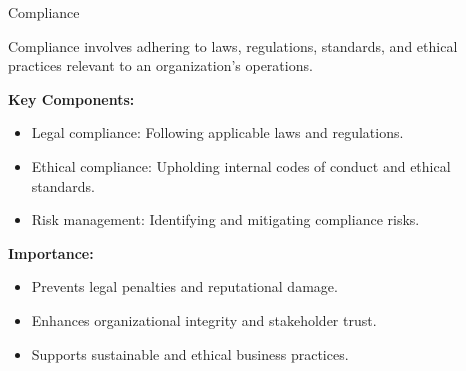 \documentclass[aspectratio=169, 10pt]{beamer}
\begin{document}
\begin{frame}{Compliance}

\begin{tcolorbox}[colback=WHUblue!5!white, colframe=WHUblue, title=Definition, fonttitle=\bfseries, sharp corners=south]
Compliance involves adhering to laws, regulations, standards, and ethical practices relevant to an organization's operations.
\end{tcolorbox}

\vspace{1em}

\textbf{Key Components:}
\begin{itemize}
  \item Legal compliance: Following applicable laws and regulations.
  \item Ethical compliance: Upholding internal codes of conduct and ethical standards.
  \item Risk management: Identifying and mitigating compliance risks.
\end{itemize}

\vspace{1em}

\textbf{Importance:}
\begin{itemize}
  \item Prevents legal penalties and reputational damage.
  \item Enhances organizational integrity and stakeholder trust.
  \item Supports sustainable and ethical business practices.
\end{itemize}

\end{frame}
\end{document}
